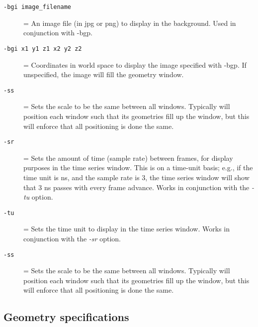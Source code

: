 \begin{description}
      \item[{\tt -bgi image\_filename}] = An image file (in jpg or png) to
        display in the background.  Used in conjunction with -bgp.
      \item[{\tt -bgi x1 y1 z1 x2 y2 z2}] = Coordinates in world space to display
        the image specified with -bgp.  If unspecified, the image will fill the
        geometry window.
      \item[{\tt -ss}] = Sets the scale to be the same between all windows.
        Typically \map{} will position each window such that its geometries
        fill up the window, but this will enforce that all positioning is
        done the same.
      \item[{\tt -sr}] = Sets the amount of time (sample rate) between
        frames, for display purposes in the time series window.  This is on
        a time-unit basis; e.g., if the time unit is ns, and the sample
        rate is 3, the time series window will show that 3 ns passes with
        every frame advance.  Works in conjunction with the \emph{-tu}
        option.
      \item[{\tt -tu}] = Sets the time unit to display in the time series
        window.  Works in conjunction with the \emph{-sr} option.
      \item[{\tt -ss}] = Sets the scale to be the same between all windows.
        Typically \map{} will position each window such that its geometries
        fill up the window, but this will enforce that all positioning is
        done the same.


\end{description}
        
\subsection{Geometry specifications}
\label{sec:usage-geometry} 


